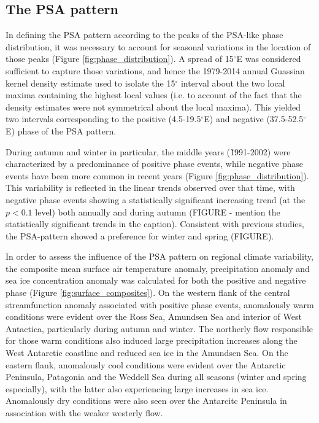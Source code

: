 \subsection{The PSA pattern}

In defining the PSA pattern according to the peaks of the PSA-like phase distribution, it was necessary to account for seasonal variations in the location of those peaks (Figure \ref{fig:phase_distribution}). A spread of 15$^{\circ}$E was considered sufficient to capture those variations, and hence the 1979-2014 annual Guassian kernel density estimate used to isolate the 15$^{\circ}$ interval about the two local maxima containing the highest local values (i.e. to account of the fact that the density estimates were not symmetrical about the local maxima). This yielded two intervals corresponding to the positive (4.5-19.5$^{\circ}$E) and negative (37.5-52.5$^{\circ}$E) phase of the PSA pattern.

During autumn and winter in particular, the middle years (\~1991-2002) were characterized by a predominance of positive phase events, while negative phase events have been more common in recent years (Figure \ref{fig:phase_distribution}). This variability is reflected in the linear trends observed over that time, with negative phase events showing a statistically significant increasing trend (at the $p < 0.1$ level) both annually and during autumn (FIGURE - mention the statistically significant trends in the caption). Consistent with previous studies, the PSA-pattern showed a preference for winter and spring (FIGURE).

In order to assess the influence of the PSA pattern on regional climate variability, the composite mean surface air temperature anomaly, precipitation anomaly and sea ice concentration anomaly was calculated for both the positive and negative phase (Figure \ref{fig:surface_composites}). On the western flank of the central streamfunction anomaly associated with positive phase events, anomalously warm conditions were evident over the Ross Sea, Amundsen Sea and interior of West Antactica, particularly during autumn and winter. The northerly flow responsible for those warm conditions also induced large precipitation increases along the West Antarctic coastline and reduced sea ice in the Amundsen Sea. On the eastern flank, anomalously cool conditions were evident over the Antarctic Peninsula, Patagonia and the Weddell Sea during all seasons (winter and spring especially), with the latter also experiencing large increases in sea ice. Anomalously dry conditions were also seen over the Antarcitc Peninsula in association with the weaker westerly flow. 

